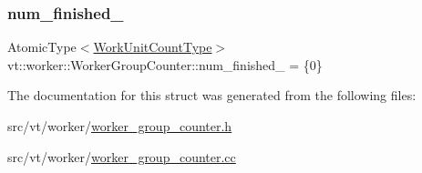 \subsubsection{\texorpdfstring{num\+\_\+finished\+\_\+}{num\_finished\_}}
{\footnotesize\ttfamily Atomic\+Type$<$\hyperlink{namespacevt_1_1worker_a8080c49350b0520151601a8b24d6c6cf}{Work\+Unit\+Count\+Type}$>$ vt\+::worker\+::\+Worker\+Group\+Counter\+::num\+\_\+finished\+\_\+ = \{0\}\hspace{0.3cm}{\ttfamily [private]}}



The documentation for this struct was generated from the following files\+:\begin{DoxyCompactItemize}
\item 
src/vt/worker/\hyperlink{worker__group__counter_8h}{worker\+\_\+group\+\_\+counter.\+h}\item 
src/vt/worker/\hyperlink{worker__group__counter_8cc}{worker\+\_\+group\+\_\+counter.\+cc}\end{DoxyCompactItemize}
